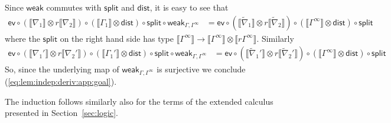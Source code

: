 \documentclass[a4paper,UKenglish,cleveref, autoref, thm-restate]{lipics-v2021}
\newcommand{\mprod}{\otimes}
\newcommand{\splt}{\mathsf{split}}
\newcommand{\distribute}{\mathsf{dist}}
\newcommand{\semweak}{\mathsf{weak}}
\newcommand{\den}[1]{\llbracket #1\rrbracket}
\begin{document}
\begin{description}[font=\sc,wide]
Since $\semweak$ commutes with $\splt$ and $\distribute$, it is easy to see that 
\begin{align*}
 \mathsf{ev} \circ (\den {\nabla_1}\mprod r\den{\nabla_2}) \circ (\den{\Gamma_1}\mprod \distribute) \circ \splt \circ \semweak_{\Gamma,\Gamma^\infty}
 & = \mathsf{ev} \circ (\den {\tilde\nabla_1}\mprod r\den{\tilde\nabla_2}) \circ (\den{\Gamma^\infty}\mprod \distribute) \circ \splt 
\end{align*} 
where the $\splt$ on the right hand side has type $\den{\Gamma^\infty} \to \den{\Gamma^\infty} \mprod \den{r \Gamma^\infty}$. 
Similarly
\begin{align*}
\mathsf{ev} \circ (\den {\nabla_1'}\mprod r\den{\nabla_2'}) \circ (\den{\Gamma_1'}\mprod \distribute) \circ \splt \circ \semweak_{\Gamma,\Gamma^\infty}
 & = \mathsf{ev} \circ (\den {\tilde\nabla_1'}\mprod r\den{\tilde\nabla_2'}) \circ (\den{\Gamma^\infty}\mprod \distribute) \circ \splt 
\end{align*}
So, since the underlying map of $\semweak_{\Gamma,\Gamma^\infty}$ is surjective we conclude (\ref{eq:lem:indep:deriv:app:goal}).
\end{description}
The induction follows similarly also for the terms of the extended calculus
presented in Section~\ref{sec:logic}.
\end{document}
